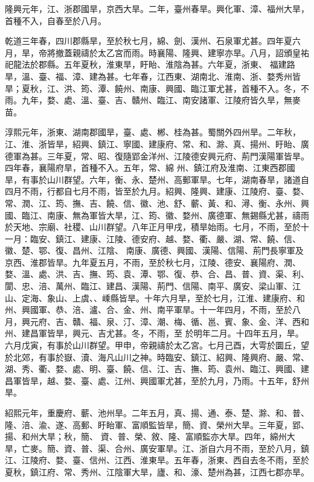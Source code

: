 \begin{pinyinscope}
 隆興元年，江、浙郡國旱，京西大旱。二年，臺州春旱。興化軍、漳、福州大旱，首種不入，自春至於八月。



 乾道三年春，四川郡縣旱，至於秋七月，綿、劍、漢州、石泉軍尤甚。四年夏六月，旱，帝將撤蓋親禱於太乙宮而雨。時襄陽、隆興、建寧亦旱。八月，詔頒皇祐祀龍法於郡縣。五年夏秋，淮東旱，盱眙、淮陰為甚。六年夏，浙東、
 福建路旱，溫、臺、福、漳、建為甚。七年春，江西東、湖南北、淮南、浙、婺秀州皆旱；夏秋，江、洪、筠、潭、饒州、南康、興國、臨江軍尤甚，首種不入。冬，不雨。九年，婺、處、溫、臺、吉、贛州、臨江、南安諸軍、江陵府皆久旱，無麥苗。



 淳熙元年，浙東、湖南郡國旱，臺、處、郴、桂為甚。蜀關外四州旱。二年秋，江、淮、浙皆旱，紹興、鎮江、寧國、建康府、常、和、滁、真、揚州、盱眙、廣德軍為甚。三年夏，常、昭、復隨郢金洋州、江陵德安興元府、荊門漢陽軍皆旱。四年春，襄陽府旱，首種不入。五年，常、綿
 州、鎮江府及淮南、江東西郡國旱，有事於山川群望。六年，衡、永、楚州、高郵軍旱。七年，湖南春旱，諸道自四月不雨，行都自七月不雨，皆至於九月。紹興、隆興、建康、江陵府、臺、婺、常、潤、江、筠、撫、吉、饒、信、徽、池、舒、蘄、黃、和、潯、衡、永州、興國、臨江、南康、無為軍皆大旱，江、筠、徽、婺州、廣德軍、無錫縣尤甚，禱雨於天地、宗廟、社稷、山川群望。八年正月甲戌，積旱始雨。七月，不雨，至於十一月：臨安、鎮江、建康、江陵、德安府、越、婺、衢、嚴、湖、常、饒、信、徽、楚、鄂、復、昌州、江陰、
 南康、廣德、興國、漢陽、信陽、荊門長寧軍及京西、淮郡皆旱。九年夏五月，不雨，至於秋七月，江陵、德安、襄陽府、潤、婺、溫、處、洪、吉、撫、筠、袁、潭、鄂、復、恭、合、昌、普、資、渠、利、閬、忠、涪、萬州、臨江、建昌、漢陽、荊門、信陽、南平、廣安、梁山軍、江山、定海、象山、上虞、、嵊縣皆旱。十年六月旱，至於七月，江淮、建康府、和州、興國軍、恭、涪、瀘、合、金、州、南平軍旱。十一年四月，不雨，至於八月，興元府、吉、贛、福、泉、汀、漳、潮、梅、循、邕、賓、象、金、洋、西和州、建昌軍皆旱，興元、吉尤甚。冬，不雨，至
 於明年二月。十四年五月，旱。六月戊寅，有事於山川群望。甲申，帝親禱於太乙宮。七月己酉，大雩於圜丘，望於北郊，有事於嶽、瀆、海凡山川之神。時臨安、鎮江、紹興、隆興府、嚴、常、湖、秀、衢、婺、處、明、臺、饒、信、江、吉、撫、筠、袁州、臨江、興國、建昌軍皆旱，越、婺、臺、處、江州、興國軍尤甚，至於九月，乃雨。十五年，舒州旱。



 紹熙元年，重慶府、蘄、池州旱。二年五月，真、揚、通、泰、楚、滁、和、普、隆、涪、渝、遂、高郵、盱眙軍、富順監皆旱，簡、資、榮州大旱。三年夏，郢、揚、和州大旱；秋，簡、
 資、普、榮、敘、隆、富順監亦大旱。四年，綿州大旱，亡麥。簡、資、普、渠、合州、廣安軍旱。江、浙自六月不雨，至於八月，鎮江、江陵府、婺、臺、信州、江西、淮東旱。五年春，浙東、西自去冬不雨，至於夏秋，鎮江府、常、秀州、江陰軍大旱，廬、和、濠、楚州為甚，江西七郡亦旱。




\end{pinyinscope}
